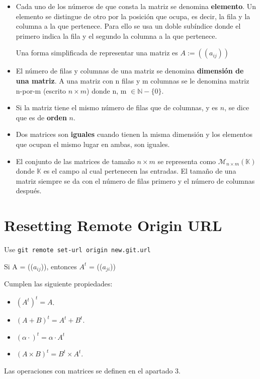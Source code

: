 \documentclass[10pt]{article}
\begin{document}
\begin{itemize}
 \item Cada uno de los números de que consta la matriz se denomina \textbf{elemento}. Un elemento se distingue de otro por la posición que ocupa, es decir, la fila y la columna a la que pertenece. Para ello se usa un doble subíndice donde el primero indica la fila y el segundo la columna a la que pertenece.
 
 Una forma simplificada de representar una matriz es $A:= ((a_{ij}))$
 \item El número de filas y columnas de una matriz se denomina \textbf{dimensión de una matriz}. A una matriz con n filas y m columnas se le denomina matriz n-por-m (escrito $n\times{m}$) donde n, m $\in{\mathbb{N}} - \{0\}$.
 \item Si la matriz tiene el mismo número de filas que de columnas, y es $n$, se dice que es de \textbf{orden} $n$.
 \item Dos matrices son \textbf{iguales} cuando tienen la misma dimensión y los elementos que ocupan el mismo lugar en ambas, son iguales.
 \item El conjunto de las matrices de tamaño $n \times{m}$ se representa como $\mathcal{M}_{n\times {m}}(\mathbb{K})$ donde $\mathbb{K}$ es el campo al cual pertenecen las entradas. El tamaño de una matriz siempre se da con el número de filas primero y el número de columnas después.
 \end {itemize}
 
\section{Resetting Remote Origin URL}


Use \texttt{git remote set-url origin new.git.url} 





Si A = (($a_{ij}$)), entonces $A^t$ = (($a_{ji}$))

Cumplen las siguiente propiedades:

\begin{itemize}
\item $(A^t)^t = A$.
\item $(A + B)^t = A^t + B^t$.
\item $(\alpha \cdot )^t = \alpha \cdot {A^t}$
\item $(A\times B)^t = B^t\times A^t$.
\end{itemize}
Las operaciones con matrices se definen en el apartado 3. \\
\end{document}
